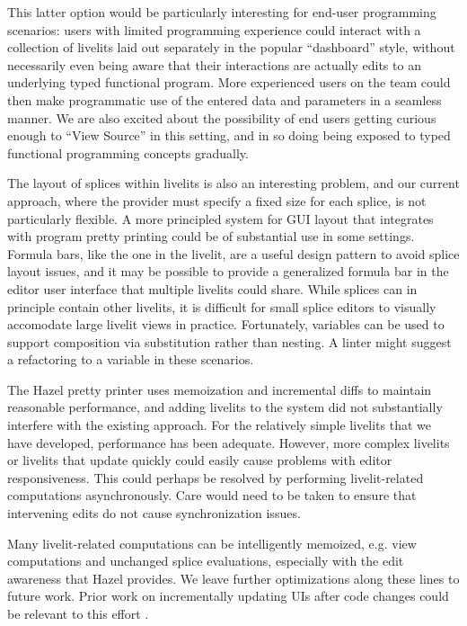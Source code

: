 This latter option 
would be particularly interesting for end-user programming scenarios: users with limited
programming experience 
could interact with a collection of livelits laid out separately in the popular ``dashboard'' style, 
without necessarily
even being aware that their interactions are actually edits to an underlying typed
functional program. More experienced users on the team could then make programmatic use of the entered
data and parameters in a seamless manner. We are also excited about the possibility of end users
getting curious enough to ``View Source'' in this setting, and in so doing 
being exposed to typed functional programming concepts gradually.

The layout of splices within livelits is also an interesting problem, and our current approach, where 
the provider must specify a fixed size for each splice, is not particularly flexible. 
A more principled system for GUI layout that integrates with program pretty 
printing could be of substantial use in some settings. Formula bars, like the one in the 
livelit, are a useful design pattern to avoid splice layout issues, and it may be possible to provide 
a generalized formula bar in the editor user interface that multiple livelits could share.
While splices can in principle contain other livelits, it is difficult for small splice editors to 
visually accomodate large livelit views in practice. 
Fortunately, variables can be used to support composition via substitution 
rather than nesting. A linter might suggest a refactoring to a variable in these scenarios.

The Hazel pretty printer uses memoization and incremental diffs to maintain reasonable performance,
and adding livelits to the system did not substantially interfere with the existing approach.
For the relatively simple livelits that we have developed, performance has been adequate.
However, more complex  livelits or livelits that update quickly 
could easily cause problems with editor responsiveness.
This could perhaps be resolved by performing livelit-related computations asynchronously. Care 
would need to be taken to ensure that intervening edits do not cause synchronization issues.

Many livelit-related computations can be intelligently memoized, e.g. view computations and unchanged splice evaluations,
especially with the edit awareness that Hazel provides. 
We leave further optimizations along these lines to future work.
Prior work on incrementally updating UIs after code changes could be relevant to this effort \cite{burckhardt2013s}.

